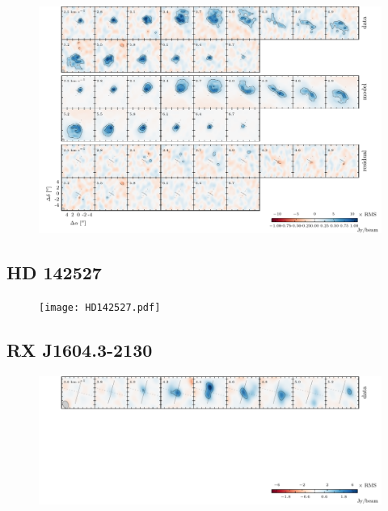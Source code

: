 \documentclass[twocolumn]{aastex6}
\begin{document}
\begin{figure}[htb]
\begin{center}
  \includegraphics[draft]{IMLup.pdf}
  \end{center}
\end{figure}

\subsection{HD 142527}

\begin{figure}[htb]
\begin{center}
  \texttt{[image: HD142527.pdf]}
  \end{center}
\end{figure}

\subsection{RX J1604.3-2130}

\begin{figure}[htb]
\begin{center}
  \includegraphics[draft]{RXJ1604.pdf}
  \end{center}
\end{figure}
\end{document}
